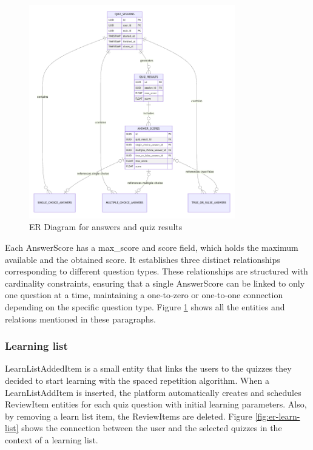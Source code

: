 \begin{figure}[H]
    \centering
    \includegraphics[width=0.8\textwidth, keepaspectratio]{figures/er-quiz-result.png}
    \caption{ER Diagram for answers and quiz results}
    \label{fig:er-quiz-result}
\end{figure}

Each AnswerScore has a max\_score and score field, which holds the maximum available and the obtained score. It establishes three distinct relationships corresponding to different question types. These relationships are structured with cardinality constraints, ensuring that a single AnswerScore can be linked to only one question at a time, maintaining a one-to-zero or one-to-one connection depending on the specific question type. Figure \ref{fig:er-quiz-result} shows all the entities and relations mentioned in these paragraphs.

\subsubsection{Learning list}

LearnListAddedItem is a small entity that links the users to the quizzes they decided to start learning with the spaced repetition algorithm. When a LearnListAddItem is inserted, the platform automatically creates and schedules ReviewItem entities for each quiz question with initial learning parameters. Also, by removing a learn list item, the ReviewItems are deleted. Figure \ref{fig:er-learn-list} shows the connection between the user and the selected quizzes in the context of a learning list.

